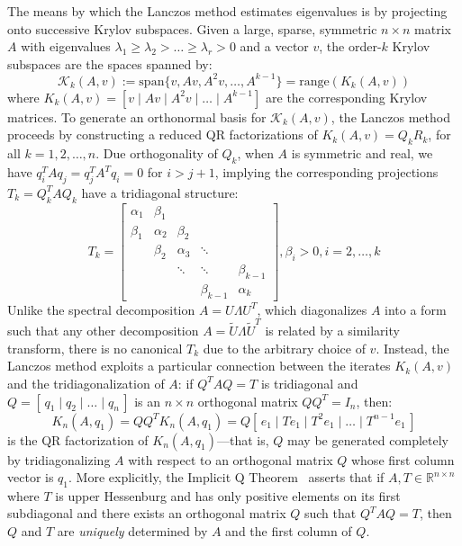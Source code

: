 \documentclass[10pt]{article}
\newcommand{\+}{%
	\raisebox{0.18ex}{\scaleobj{0.55}{+}}
}
\begin{document}
The means by which the Lanczos method estimates eigenvalues is by projecting onto successive Krylov subspaces. Given a large, sparse, symmetric $n \times n$ matrix $A$ with eigenvalues $\lambda_1 \geq \lambda_2 > \dots \geq \lambda_r > 0$ and a vector $v$, the order-$k$ Krylov subspaces are the spaces spanned by: 
\begin{equation}
	\mathcal{K}_k(A, v) := \mathrm{span}\{ v, Av, A^2 v, \dots, A^{k-1} \} = \mathrm{range}(K_k(A, v))
\end{equation}
where $K_k(A, v) = [ v \mid Av \mid A^2 v \mid \dots \mid A^{k-1}]$ are the corresponding Krylov matrices. To generate an orthonormal basis for $\mathcal{K}_k(A, v)$, the Lanczos method proceeds by constructing a reduced QR factorizations of $K_k(A,v) = Q_k R_k$, for all $k = 1, 2, \dots, n$.
Due orthogonality of $Q_k$, when $A$ is symmetric and real, we have $q_i^T A q_j = q_j^T A^T q_i = 0$ for $i > j + 1$, implying the corresponding projections $T_k = Q_k^T A Q_k$ have a tridiagonal structure:
\begin{equation}
	T_k = \begin{bmatrix} 
	\alpha_1 & \beta_1 & & & \\
	\beta_1 & \alpha_2 & \beta_2 & & \\
	 & \beta_2 & \alpha_3 & \ddots & \\
	& & \ddots & \ddots & \beta_{k-1} \\
	& & & \beta_{k-1} & \alpha_{k} 
	\end{bmatrix}, \beta_i > 0, i = 2, \dots, k
\end{equation}
Unlike the spectral decomposition $A = U \Lambda U^T$, which diagonalizes $A$ into a form such that any other decomposition $A = \tilde{U}\Lambda\tilde{U}^T$ is related by a similarity transform, there is no canonical $T_k$ due to the arbitrary choice of $v$. 
Instead, the Lanczos method exploits a particular connection between the iterates $K_k(A,v)$ and the tridiagonalization of $A$: if $Q^T A Q = T$ is tridiagonal and $Q= [\, q_1 \mid q_2 \mid \dots \mid q_n \,]$ is an $n \times n$ orthogonal matrix $Q Q^T = I_n$, then:
\begin{equation}
	K_n(A, q_1) = Q Q^T K_n(A, q_1) = Q[ \, e_1 \mid T e_1 \mid T^2 e_1 \mid \dots \mid T^{n-1} e_1 \, ]
\end{equation}
is the QR factorization of $K_n(A, q_1)$---that is, $Q$ may be generated completely by tridiagonalizing $A$ with respect to an orthogonal matrix $Q$ whose first column vector is $q_1$. 
More explicitly, the Implicit Q Theorem~\cite{golub2013matrix} asserts that if $A,T \in \mathbb{R}^{n \times n}$ where $T$ is upper Hessenburg and has only positive elements on its first subdiagonal and there exists an orthogonal matrix $Q$ such that $Q^T A Q = T$, then $Q$ and $T$ are \emph{uniquely} determined by $A$ and the first column of $Q$. 
\end{document}
